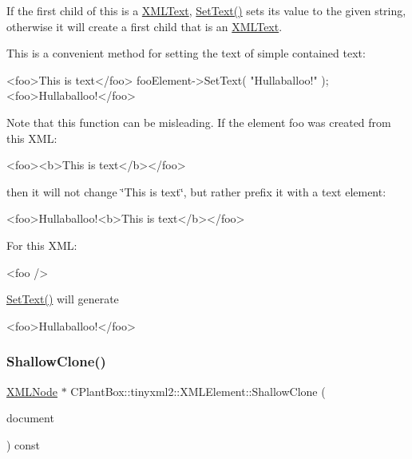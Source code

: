 If the first child of \textquotesingle{}this\textquotesingle{} is a \hyperlink{classCPlantBox_1_1tinyxml2_1_1XMLText}{X\+M\+L\+Text}, \hyperlink{classCPlantBox_1_1tinyxml2_1_1XMLElement_ab658660a1b4c5892a48c084c9dacfdcf}{Set\+Text()} sets its value to the given string, otherwise it will create a first child that is an \hyperlink{classCPlantBox_1_1tinyxml2_1_1XMLText}{X\+M\+L\+Text}.

This is a convenient method for setting the text of simple contained text\+: \begin{DoxyVerb}<foo>This is text</foo>
    fooElement->SetText( "Hullaballoo!" );
<foo>Hullaballoo!</foo>
\end{DoxyVerb}


Note that this function can be misleading. If the element foo was created from this X\+ML\+: \begin{DoxyVerb}    <foo><b>This is text</b></foo>
\end{DoxyVerb}


then it will not change \char`\"{}\+This is text\char`\"{}, but rather prefix it with a text element\+: \begin{DoxyVerb}    <foo>Hullaballoo!<b>This is text</b></foo>
\end{DoxyVerb}


For this X\+ML\+: \begin{DoxyVerb}    <foo />
\end{DoxyVerb}
 \hyperlink{classCPlantBox_1_1tinyxml2_1_1XMLElement_ab658660a1b4c5892a48c084c9dacfdcf}{Set\+Text()} will generate \begin{DoxyVerb}    <foo>Hullaballoo!</foo>
\end{DoxyVerb}
 \mbox{\label{classCPlantBox_1_1tinyxml2_1_1XMLElement_aef0ff3a4acbaefbf2bea75cde7680d64}} 
\subsubsection{\texorpdfstring{Shallow\+Clone()}{ShallowClone()}}
{\footnotesize\ttfamily \hyperlink{classCPlantBox_1_1tinyxml2_1_1XMLNode}{X\+M\+L\+Node} $\ast$ C\+Plant\+Box\+::tinyxml2\+::\+X\+M\+L\+Element\+::\+Shallow\+Clone (\begin{DoxyParamCaption}\item[{\hyperlink{classCPlantBox_1_1tinyxml2_1_1XMLDocument}{X\+M\+L\+Document} $\ast$}]{document }\end{DoxyParamCaption}) const\hspace{0.3cm}{\ttfamily [virtual]}}

